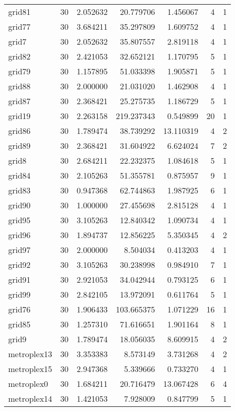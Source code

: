 \begin{longtable}{|l|r|r|r|r|r|r|}
grid81 & 30 & 2.052632 & 20.779706 & 1.456067 & 4 & 1 \\
grid77 & 30 & 3.684211 & 35.297809 & 1.609752 & 4 & 1 \\
grid7 & 30 & 2.052632 & 35.807557 & 2.819118 & 4 & 1 \\
grid82 & 30 & 2.421053 & 32.652121 & 1.170795 & 5 & 1 \\
grid79 & 30 & 1.157895 & 51.033398 & 1.905871 & 5 & 1 \\
grid88 & 30 & 2.000000 & 21.031020 & 1.462908 & 4 & 1 \\
grid87 & 30 & 2.368421 & 25.275735 & 1.186729 & 5 & 1 \\
grid19 & 30 & 2.263158 & 219.237343 & 0.549899 & 20 & 1 \\
grid86 & 30 & 1.789474 & 38.739292 & 13.110319 & 4 & 2 \\
grid89 & 30 & 2.368421 & 31.604922 & 6.624024 & 7 & 2 \\
grid8 & 30 & 2.684211 & 22.232375 & 1.084618 & 5 & 1 \\
grid84 & 30 & 2.105263 & 51.355781 & 0.875957 & 9 & 1 \\
grid83 & 30 & 0.947368 & 62.744863 & 1.987925 & 6 & 1 \\
grid90 & 30 & 1.000000 & 27.455698 & 2.815128 & 4 & 1 \\
grid95 & 30 & 3.105263 & 12.840342 & 1.090734 & 4 & 1 \\
grid96 & 30 & 1.894737 & 12.856225 & 5.350345 & 4 & 2 \\
grid97 & 30 & 2.000000 & 8.504034 & 0.413203 & 4 & 1 \\
grid92 & 30 & 3.105263 & 30.238998 & 0.984910 & 7 & 1 \\
grid91 & 30 & 2.921053 & 34.042944 & 0.793125 & 6 & 1 \\
grid99 & 30 & 2.842105 & 13.972091 & 0.611764 & 5 & 1 \\
grid76 & 30 & 1.906433 & 103.665375 & 1.071229 & 16 & 1 \\
grid85 & 30 & 1.257310 & 71.616651 & 1.901164 & 8 & 1 \\
grid9 & 30 & 1.789474 & 18.056035 & 8.609915 & 4 & 2 \\
metroplex13 & 30 & 3.353383 & 8.573149 & 3.731268 & 4 & 2 \\
metroplex15 & 30 & 2.947368 & 5.339666 & 0.733270 & 4 & 1 \\
metroplex0 & 30 & 1.684211 & 20.716479 & 13.067428 & 6 & 4 \\
metroplex14 & 30 & 1.421053 & 7.928009 & 0.847799 & 5 & 1 \\

\end{longtable}
